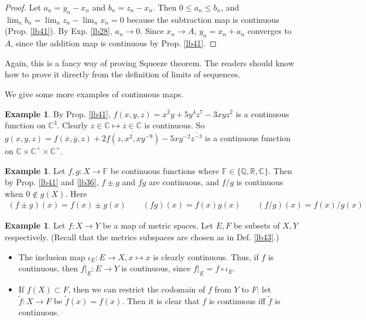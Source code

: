 \documentclass[12pt,b5paper,notitlepage]{article}
\theoremstyle{definition}
\newtheorem{eg}[df]{Example}
\theoremstyle{plain}
\newcommand{\wtd}{\widetilde}
\newcommand{\ovl}{\overline}
\newcommand{\Cbb}{\mathbb C}
\newcommand{\Qbb}{\mathbb Q}
\newcommand{\Rbb}{\mathbb R}
\newcommand{\Fbb}{\mathbb F}
\numberwithin{equation}{section}
\begin{document}
\begin{proof}
Let $a_n=y_n-x_n$ and $b_n=z_n-x_n$. Then $0\leq a_n\leq b_n$, and $\lim_n b_n=\lim_n z_n-\lim_n x_n= 0$ because the subtraction map is continuous (Prop. \ref{lb41}). By Exp. \ref{lb28}, $a_n\rightarrow 0$. Since $x_n\rightarrow A$, $y_n=x_n+a_n$ converges to $A$, since the addition map is continuous by Prop. \ref{lb41}.
\end{proof}

Again, this is a fancy way of proving Squeeze theorem. The readers should know how to prove it directly from the definition of limits of sequences.

We give some more examples of continuous maps.

\begin{eg}
By Prop. \ref{lb41}, $f(x,y,z)=x^2y+5y^4z^7-3xyz^2$ is a continuous function on $\Cbb^3$. Clearly $z\in\Cbb\mapsto \ovl z\in\Cbb$ is continuous. So $g(x,y,z)=f(\ovl x,\ovl y,z)+2\ovl{f(z,x^2,xy^{-9})}-5xy^{-2}\ovl{z^{-3}}$ is a continuous function on $\Cbb\times\Cbb^\times\times\Cbb^\times$.
\end{eg}


\begin{eg}\label{lb44}
Let $f,g:X\rightarrow \Fbb$ be continuous functions where $\Fbb\in\{\Qbb,\Rbb,\Cbb\}$. Then by Prop. \ref{lb41} and \ref{lb36}, $f\pm g$ and $fg$ are continuous, and $f/g$ is continuous when $0\notin g(X)$. Here
\begin{align}
(f\pm g)(x)=f(x)\pm g(x)\qquad (fg)(x)=f(x)g(x)\qquad (f/g)(x)=f(x)/g(x)
\end{align} 
\end{eg}


\begin{eg}\label{lb54}
Let $f:X\rightarrow Y$ be a map of metric spaces. Let $E,F$ be subsets of $X,Y$ respectively. (Recall that the metrics subspaces are chosen as in Def. \ref{lb43}.) 
\begin{itemize}
\item The inclusion map $\iota_E:E\rightarrow X,x\mapsto x$ is clearly continuous. Thus, if $f$ is continuous, then $f|_E:E\rightarrow Y$ is continuous, since $f|_E=f\circ\iota_E$.
\item If $f(X)\subset F$, then we can restrict the codomain of $f$ from $Y$ to $F$: let $\wtd f:X\rightarrow F$ be $\wtd f(x)=f(x)$. Then it is clear that $f$ is continuous iff $\wtd f$ is continuous.
\end{itemize}
\end{eg}
\end{document}
